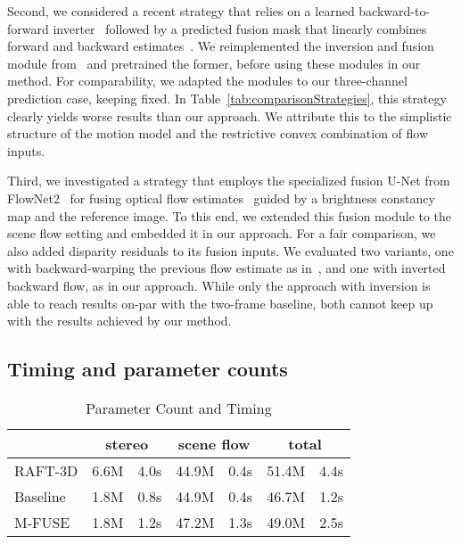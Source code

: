 \documentclass[10pt,twocolumn,letterpaper]{article}
\begin{document}
Second, we considered a recent strategy that relies on a learned backward-to-forward inverter~\cite{Maurer2018_ProFlow,Schuster2021_DTF} followed by a predicted fusion mask that linearly combines forward and backward estimates~\cite{Schuster2021_DTF}.
We reimplemented the inversion and fusion module from~\cite{Schuster2021_DTF} and pretrained the former, before using these modules in our method.
For comparability, we adapted the modules to our three-channel prediction case, keeping  fixed.
In Table~\ref{tab:comparisonStrategies}, this strategy clearly yields worse results than our approach.
We attribute this to the simplistic structure of the motion model and the restrictive convex combination of flow inputs.



Third, we investigated a strategy that employs the specialized fusion U-Net from FlowNet2~\cite{Ilg2017_Flownet2} for fusing optical flow estimates~\cite{Ren2019_FlowTemporalFusion} guided by a brightness constancy map and the reference image.
To this end, we extended this fusion module to the scene flow setting and embedded it in our approach.
For a fair comparison, we also added disparity residuals to its fusion inputs.
We evaluated two variants, one with backward-warping the previous flow estimate as in~\cite{Ren2019_FlowTemporalFusion}, and one with inverted backward flow, as in our approach.
While only the approach with inversion is able to reach results on-par with the two-frame baseline, both cannot keep up with the results achieved by our method.


\subsection{Timing and parameter counts}


\begin{table}
\setlength\tabcolsep{3.5pt}
\caption{Parameter Count and Timing}
\label{tab:paramcount}
\begin{center}
\begin{tabular}{lcccccc}
\toprule
& \multicolumn{2}{c}{stereo} & \multicolumn{2}{c}{scene flow} & \multicolumn{2}{c}{total}
\\
\midrule
RAFT-3D\;\; & 6.6M & 4.0s\;\; & 44.9M & 0.4s\;\; & 51.4M & 4.4s
\\
Baseline & 1.8M & 0.8s\;\; & 44.9M & 0.4s\;\; & 46.7M & 1.2s
\\
M-FUSE & 1.8M & 1.2s\;\; & 47.2M & 1.3s\;\; & 49.0M & 2.5s
\\
\bottomrule
\end{tabular}
\end{center}
\end{table}
\end{document}
